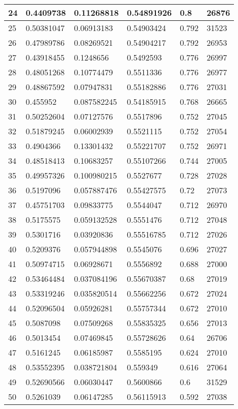\begin{longtable}{|l|l|l|l|l|l|}
24 & 0.4409738 & 0.11268818 & 0.54891926 & 0.8 & 26876 \\ \hline 
25 & 0.50381047 & 0.06913183 & 0.54903424 & 0.792 & 31523 \\ \hline 
26 & 0.47989786 & 0.08269521 & 0.54904217 & 0.792 & 26953 \\ \hline 
27 & 0.43918455 & 0.1248656 & 0.5492593 & 0.776 & 26997 \\ \hline 
28 & 0.48051268 & 0.10774479 & 0.5511336 & 0.776 & 26977 \\ \hline 
29 & 0.48867592 & 0.07947831 & 0.55182886 & 0.776 & 27031 \\ \hline 
30 & 0.455952 & 0.087582245 & 0.54185915 & 0.768 & 26665 \\ \hline 
31 & 0.50252604 & 0.07127576 & 0.5517896 & 0.752 & 27045 \\ \hline 
32 & 0.51879245 & 0.06002939 & 0.5521115 & 0.752 & 27054 \\ \hline 
33 & 0.4904366 & 0.13301432 & 0.55221707 & 0.752 & 26971 \\ \hline 
34 & 0.48518413 & 0.10683257 & 0.55107266 & 0.744 & 27005 \\ \hline 
35 & 0.49957326 & 0.100980215 & 0.5527677 & 0.728 & 27028 \\ \hline 
36 & 0.5197096 & 0.057887476 & 0.55427575 & 0.72 & 27073 \\ \hline 
37 & 0.45751703 & 0.09833775 & 0.5544047 & 0.712 & 26970 \\ \hline 
38 & 0.5175575 & 0.059132528 & 0.5551476 & 0.712 & 27048 \\ \hline 
39 & 0.5301716 & 0.03920836 & 0.55516785 & 0.712 & 27026 \\ \hline 
40 & 0.5209376 & 0.057944898 & 0.5545076 & 0.696 & 27027 \\ \hline 
41 & 0.50974715 & 0.06928671 & 0.5556892 & 0.688 & 27000 \\ \hline 
42 & 0.53464484 & 0.037084196 & 0.55670387 & 0.68 & 27019 \\ \hline 
43 & 0.53319246 & 0.035820514 & 0.55662256 & 0.672 & 27024 \\ \hline 
44 & 0.52096504 & 0.05926281 & 0.55757344 & 0.672 & 27010 \\ \hline 
45 & 0.5087098 & 0.07509268 & 0.55835325 & 0.656 & 27013 \\ \hline 
46 & 0.5013454 & 0.07469845 & 0.55728626 & 0.64 & 26706 \\ \hline 
47 & 0.5161245 & 0.06185987 & 0.5585195 & 0.624 & 27010 \\ \hline 
48 & 0.53552395 & 0.038721804 & 0.559349 & 0.616 & 27064 \\ \hline 
49 & 0.52690566 & 0.06030447 & 0.5600866 & 0.6 & 31529 \\ \hline 
50 & 0.5261039 & 0.06147285 & 0.56115913 & 0.592 & 27038 \\ \hline 
\end{longtable}